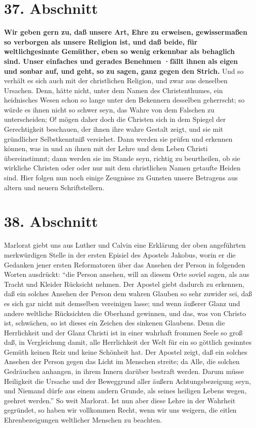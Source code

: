 \section{37. Abschnitt} \label{kap9_ab37}

\textbf{Wir geben gern zu, daß unsere Art, Ehre zu erweisen, gewissermaßen so verborgen
als unsere Religion ist, und daß beide, für weltlichgesinnte Gemüther, eben so
wenig erkennbar als behaglich sind. Unser einfaches und gerades Benehmen ·fällt
ihnen als eigen und sonbar auf, und geht, so zu sagen, ganz gegen den Strich.} 
Und so verhält es sich auch mit der christlichen Religion, und zwar aus
denselben Ursachen. Denn, hätte nicht, unter dem Namen des Christenthumes, ein
heidnisches Wesen schon so lange unter den Bekennern desselben geherrscht; so
würde es ihnen nicht so schwer seyn, das Wahre von dem Falschen zu
unterscheiden; O! mögen daher doch die Christen sich in dem Spiegel der
Gerechtigkeit beschauen, der ihnen ihre wahre Gestalt zeigt, und sie mit
gründlicher Selbstkenntniß versiehet. Dann werden sie prüfen und erkennen
können, was in und an ihnen mit der Lehre und dem Leben Christi übereinstimmt;
dann werden sie im Stande seyn, richtig zu beurtheilen, ob sie wirkliche
Christen oder oder nur mit dem christlichen Namen getaufte Heiden sind. Hier
folgen nun noch einige Zeugnisse zu Gunsten unsere Betragens aus altern und
neuern Schriftstellern.

\section{38. Abschnitt} \label{kap9_ab38}

Marlorat giebt uns aus Luther und Calvin eine Erklärung der oben angeführten
merkwürdigen Stelle in der ersten Episiel des Apostels Jakobus, worin er die
Gedanken jener ersten Reformatoren über das Ansehen der Person in folgenden
Worten ausdrückt: "`die Person ansehen, will an diesem Orte soviel sagen, als
aus Tracht und Kleider Rücksicht nehmen. Der Apostel giebt dadurch zu erkennen,
daß ein solches Ansehen der Person dem wahren Glauben so sehr zuwider sei, daß
es sich gar nicht mit demselben vereinigen lasse; und wenn äußerer Glanz und
andere weltliche Rücksichten die Oberhand gewinnen, und das, was von Christo
ist, schwächen, so ist dieses ein Zeichen des sinkenen Glaubens. Denn die
Herrlichkeit und der Glanz Christi ist in einer wahrhaft frommen Seele so groß
daß, in Vergleichung damit, alle Herrlichkeit der Welt für ein so göttlich
gesinntes Gemüth keinen Reiz und keine Schönheit hat. Der Apostel zeigt, daß ein
solches Ansehen der Person gegen das Licht im Menschen streite; da Alle, die
solchen Gedräuchen anhangen, in ihrem Innern darüber bestraft werden. Darum
müsse Heiligkeit die Ursache und der Beweggrund aller äußern Achtungsbezeigung
seyn, und Niemand dürfe aus einem andern Grunde, als seines heiligen Lebens
wegen, geehret werden."' So weit Marlorat. Ist nun aber diese Lehre in der
Wahrheit gegründet, so haben wir vollkommen Recht, wenn wir uns weigern, die
eitlen Ehrenbezeigungen weltlicher Menschen zu beachten.

